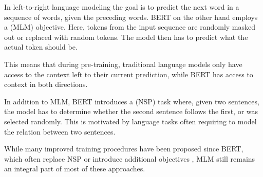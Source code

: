 In left-to-right language modeling the goal is to predict the next word in a sequence of words, given the preceding words. BERT on the other hand employs a  (MLM) objective. Here, tokens from the input sequence are randomly masked out or replaced with random tokens. The model then has to predict what the actual token should be.

This means that during pre-training, traditional language models only have access to the context left to their current prediction, while BERT has access to context in both directions.

In addition to MLM, BERT introduces a  (NSP) task where, given two sentences, the model has to determine whether the second sentence follows the first, or was selected randomly. This is motivated by language tasks often requiring to model the relation between two sentences.

While many improved training procedures have been proposed since BERT, which often replace NSP or introduce additional objectives \cite{DBLP:journals/corr/abs-2003-10555, DBLP:journals/corr/abs-1907-11692, 10.5555/3454287.3454804, Lan2020ALBERT}, MLM still remains an integral part of most of these approaches.